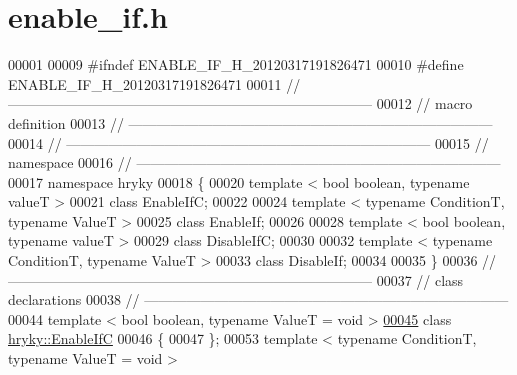 \hypertarget{enable__if_8h_source}{\section{enable\-\_\-if.\-h}
}

\begin{DoxyCode}
00001 
00009 \textcolor{preprocessor}{#ifndef ENABLE\_IF\_H\_20120317191826471}
00010 \textcolor{preprocessor}{}\textcolor{preprocessor}{#define ENABLE\_IF\_H\_20120317191826471}
00011 \textcolor{preprocessor}{}\textcolor{comment}{//
      ------------------------------------------------------------------------------}
00012 \textcolor{comment}{// macro definition}
00013 \textcolor{comment}{//
      ------------------------------------------------------------------------------}
00014 \textcolor{comment}{//
      ------------------------------------------------------------------------------}
00015 \textcolor{comment}{// namespace}
00016 \textcolor{comment}{//
      ------------------------------------------------------------------------------}
00017 \textcolor{keyword}{namespace }hryky
00018 \{
00020     \textcolor{keyword}{template} < \textcolor{keywordtype}{bool} \textcolor{keywordtype}{boolean}, \textcolor{keyword}{typename} valueT  >
00021     \textcolor{keyword}{class }EnableIfC;
00022     
00024     \textcolor{keyword}{template} < \textcolor{keyword}{typename} ConditionT, \textcolor{keyword}{typename} ValueT >
00025     \textcolor{keyword}{class }EnableIf;
00026 
00028     \textcolor{keyword}{template} < \textcolor{keywordtype}{bool} \textcolor{keywordtype}{boolean}, \textcolor{keyword}{typename} valueT  >
00029     \textcolor{keyword}{class }DisableIfC;
00030     
00032     \textcolor{keyword}{template} < \textcolor{keyword}{typename} ConditionT, \textcolor{keyword}{typename} ValueT >
00033     \textcolor{keyword}{class }DisableIf;
00034 
00035 \}
00036 \textcolor{comment}{//
      ------------------------------------------------------------------------------}
00037 \textcolor{comment}{// class declarations}
00038 \textcolor{comment}{//
      ------------------------------------------------------------------------------}
00044 \textcolor{comment}{}\textcolor{keyword}{template} < \textcolor{keywordtype}{bool} \textcolor{keywordtype}{boolean}, \textcolor{keyword}{typename} ValueT = \textcolor{keywordtype}{void} >
\hypertarget{enable__if_8h_source_l00045}{}\hyperlink{classhryky_1_1_enable_if_c}{00045} \textcolor{keyword}{class }\hyperlink{classhryky_1_1_enable_if_c}{hryky::EnableIfC}
00046 \{
00047 \};
00053 \textcolor{keyword}{template} < \textcolor{keyword}{typename} ConditionT, \textcolor{keyword}{typename} ValueT = \textcolor{keywordtype}{void} >

\end{DoxyCode}
